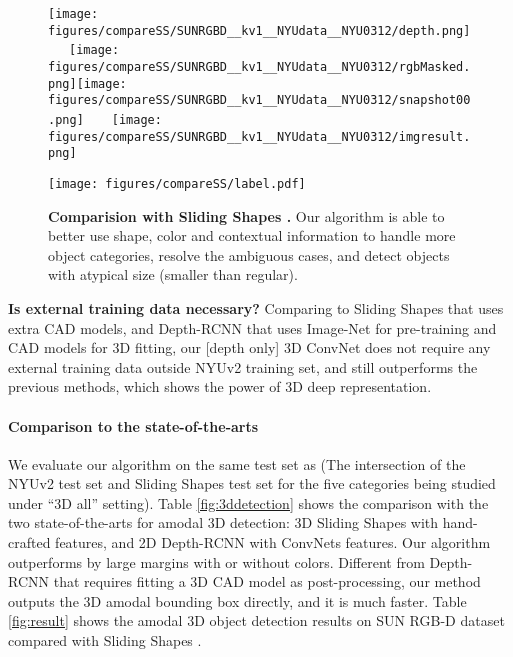 \documentclass[10pt,twocolumn,letterpaper]{article}
\begin{document}
\begin{figure}[t]
\begin{center}
\texttt{[image: figures/compareSS/SUNRGBD\_\_kv1\_\_NYUdata\_\_NYU0312/depth.png]}~~~\texttt{[image: figures/compareSS/SUNRGBD\_\_kv1\_\_NYUdata\_\_NYU0312/rgbMasked.png]}\texttt{[image: figures/compareSS/SUNRGBD\_\_kv1\_\_NYUdata\_\_NYU0312/snapshot00.png]}~~~~\texttt{[image: figures/compareSS/SUNRGBD\_\_kv1\_\_NYUdata\_\_NYU0312/imgresult.png]}

\texttt{[image: figures/compareSS/label.pdf]}
\end{center}

\vspace{-4mm}

\caption{{\bf Comparision with Sliding Shapes \cite{SlidingShapes}.} Our algorithm is able to better use shape, color and contextual information to handle more object categories, resolve the ambiguous cases, and detect objects with atypical size (\eg smaller than regular).
}
\label{fig:compareSS}
\vspace{-5mm}
\end{figure}


{\bf Is external training data necessary?}
Comparing to Sliding Shapes that uses extra CAD models,
and Depth-RCNN that uses Image-Net for pre-training and CAD models for 3D fitting,
our [depth only] 3D ConvNet does not require any external training data outside NYUv2 training set, and still outperforms the previous methods, which shows the power of 3D deep representation. 

\vspace{-4mm}\paragraph{Comparison to the state-of-the-arts}
We evaluate our algorithm on the same test set as \cite{guptaCVPR15}
(The intersection of the NYUv2 test set and Sliding Shapes test set for the five categories being studied under ``3D all'' setting).
Table \ref{fig:3ddetection} shows the comparison with the two state-of-the-arts for amodal 3D detection:
3D Sliding Shapes \cite{SlidingShapes} with hand-crafted features,
and 2D Depth-RCNN \cite{guptaCVPR15} with ConvNets features.
Our algorithm outperforms by large margins with or without colors.
Different from Depth-RCNN that requires fitting a 3D CAD model as post-processing, 
our method outputs the 3D amodal bounding box directly,
and it is much faster.
Table \ref{fig:result} shows the amodal 3D object detection results on SUN RGB-D dataset compared with Sliding Shapes \cite{SlidingShapes}. 
\end{document}
